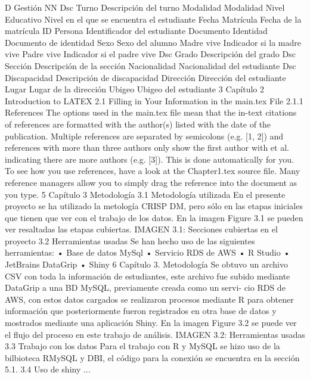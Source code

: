 D Gestión NN
Dsc Turno Descripción del turno
Modalidad Modalidad
Nivel Educativo Nivel en el que se encuentra el estudiante
Fecha Matrícula Fecha de la matrícula
ID Persona Identificador del estudiante
Documento Identidad Documento de identidad
Sexo Sexo del alumno
Madre vive Indicador si la madre vive
Padre vive Indicador si el padre vive
Dsc Grado Descripción del grado
Dsc Sección Descripción de la sección
Nacionalidad Nacionalidad del estudiante
Dsc Discapacidad Descripción de discapacidad
Dirección Dirección del estudiante
Lugar Lugar de la dirección
Ubigeo Ubigeo del estudiante
3
Capítulo 2
Introduction to LATEX
2.1 Filling in Your Information in the main.tex File
2.1.1 References
The options used in the main.tex file mean that the in-text citations of references
are formatted with the author(s) listed with the date of the publication. Multiple
references are separated by semicolons (e.g. [1, 2]) and references with more than
three authors only show the first author with et al. indicating there are more authors
(e.g. [3]). This is done automatically for you. To see how you use references, have
a look at the Chapter1.tex source file. Many reference managers allow you to
simply drag the reference into the document as you type.
5
Capítulo 3
Metodología
3.1 Metodología utilizada
En el presente proyecto se ha utilizado la metología CRISP DM, pero sólo en las
etapas iniciales que tienen que ver con el trabajo de los datos. En la imagen Figure 3.1
se pueden ver resaltadas las etapas cubiertas.
IMAGEN 3.1: Secciones cubiertas en el proyecto
3.2 Herramientas usadas
Se han hecho uso de las siguientes herramientas:
• Base de datos MySql
• Servicio RDS de AWS
• R Studio
• JetBrains DataGrip
• Shiny
6 Capítulo 3. Metodología
Se obtuvo un archivo CSV con toda la información de estudiantes, este archivo fue
subido mediante DataGrip a una BD MySQL, previamente creada como un servi-
cio RDS de AWS, con estos datos cargados se realizaron procesos mediante R para
obtener información que posteriormente fueron registrados en otra base de datos y
mostrados mediante una aplicación Shiny.
En la imagen Figure 3.2 se puede ver el flujo del proceso en este trabajo de análisis.
IMAGEN 3.2: Herramientas usadas
3.3 Trabajo con los datos
Para el trabajo con R y MySQL se hizo uso de la bilbioteca RMySQL y DBI, el código
para la conexión se encuentra en la sección 5.1.
3.4 Uso de shiny
...
